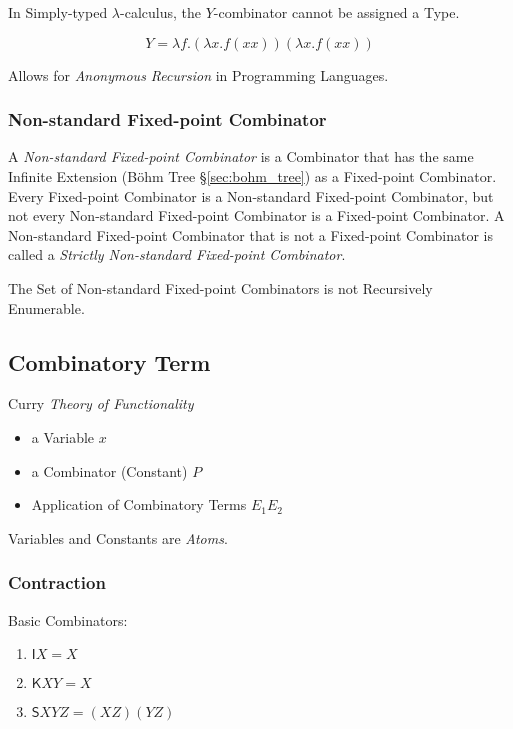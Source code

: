 In Simply-typed $\lambda$-calculus, the $Y$-combinator cannot be assigned a
Type.

\[
  Y = \lambda f.(\lambda x.f (x x)) (\lambda x.f (x x))
\]

Allows for \emph{Anonymous Recursion} in Programming Languages.



\subsubsection{Non-standard Fixed-point Combinator}
\label{sec:nonstandard_combinator}

A \emph{Non-standard Fixed-point Combinator} is a Combinator that has the same
Infinite Extension (B\"ohm Tree \S\ref{sec:bohm_tree}) as a Fixed-point
Combinator. Every Fixed-point Combinator is a Non-standard Fixed-point
Combinator, but not every Non-standard Fixed-point Combinator is a Fixed-point
Combinator. A Non-standard Fixed-point Combinator that is not a Fixed-point
Combinator is called a \emph{Strictly Non-standard Fixed-point Combinator}.

The Set of Non-standard Fixed-point Combinators is not Recursively Enumerable.
\cite{goldberg05}



\subsection{Combinatory Term}\label{sec:combinatory_term}

Curry \emph{Theory of Functionality}

\begin{itemize}
  \item a Variable $x$
  \item a Combinator (Constant) $P$
  \item Application of Combinatory Terms $E_1 E_2$
\end{itemize}
Variables and Constants are \emph{Atoms}.



\subsubsection{Contraction}\label{sec:combinatory_contraction}
\cite{seldin03}

Basic Combinators:
\begin{enumerate}
  \item $\mathsf{I} X = X$
  \item $\mathsf{K} X Y = X$
  \item $\mathsf{S} X Y Z = (X Z) (Y Z)$
\end{enumerate}

